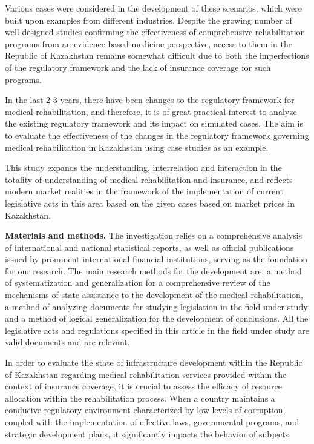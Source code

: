 \begin{multicols}{2}
Various cases were considered in the development of these scenarios,
which were built upon examples from different industries. Despite the
growing number of well-designed studies confirming the effectiveness of
comprehensive rehabilitation programs from an evidence-based medicine
perspective, access to them in the Republic of Kazakhstan remains
somewhat difficult due to both the imperfections of the regulatory
framework and the lack of insurance coverage for such programs.

In the last 2-3 years, there have been changes to the regulatory
framework for medical rehabilitation, and therefore, it is of great
practical interest to analyze the existing regulatory framework and its
impact on simulated cases. The aim is to evaluate the effectiveness of
the changes in the regulatory framework governing medical rehabilitation
in Kazakhstan using case studies as an example.

This study expands the understanding, interrelation and interaction in
the totality of understanding of medical rehabilitation and insurance,
and reflects modern market realities in the framework of the
implementation of current legislative acts in this area based on the
given cases based on market prices in Kazakhstan.

{\bfseries Materials and methods.} The investigation relies on a
comprehensive analysis of international and national statistical
reports, as well as official publications issued by prominent
international financial institutions, serving as the foundation for our
research. The main research methods for the development are: a method of
systematization and generalization for a comprehensive review of the
mechanisms of state assistance to the development of the medical
rehabilitation, a method of analyzing documents for studying legislation
in the field under study and a method of logical generalization for the
development of conclusions. All the legislative acts and regulations
specified in this article in the field under study are valid documents
and are relevant.

In order to evaluate the state of infrastructure development within the
Republic of Kazakhstan regarding medical rehabilitation services
provided within the context of insurance coverage, it is crucial to
assess the efficacy of resource allocation within the rehabilitation
process. When a country maintains a conducive regulatory environment
characterized by low levels of corruption, coupled with the
implementation of effective laws, governmental programs, and strategic
development plans, it significantly impacts the behavior of subjects.


\end{multicols}
